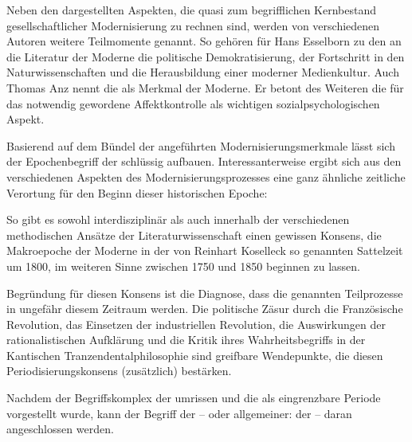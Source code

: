 Neben den dargestellten Aspekten, die quasi zum begrifflichen Kernbestand
gesellschaftlicher Modernisierung zu rechnen sind, werden von verschiedenen
Autoren weitere Teilmomente genannt. So gehören  für Hans
Esselborn zu den \Cite{zentralen außerliterarischen Herausforderungen} an die
Literatur der Moderne die politische Demokratisierung, der Fortschritt in den
Naturwissenschaften und die Herausbildung einer moderner
Medienkultur. Auch Thomas Anz nennt
die \Cite{Expansion massenkommunkativer Prozesse} als Merkmal der
\Cite{zivilisatorischen} Moderne. Er betont des Weiteren die für das
\Cite{zivilisierte Subjekt} notwendig gewordene Affektkontrolle als wichtigen
sozialpsychologischen Aspekt.

Basierend auf dem Bündel der angeführten Modernisierungsmerkmale lässt sich
der Epochenbegriff der \Cite{gesellschaftlichen Moderne} schlüssig aufbauen.
Interessanterweise ergibt sich aus den verschiedenen Aspekten des
Modernisierungsprozesses eine ganz ähnliche zeitliche Verortung für den Beginn
dieser historischen Epoche:

\begin{BlockQuote}
  So gibt es sowohl interdisziplinär als auch innerhalb der verschiedenen
  methodischen Ansätze der Literaturwissenschaft einen gewissen Konsens, die
  Makroepoche der Moderne in der von Reinhart Koselleck so genannten Sattelzeit
  um 1800, im weiteren Sinne zwischen 1750 und 1850 beginnen zu
  lassen.
\end{BlockQuote}
Begründung für diesen Konsens ist die Diagnose, dass die genannten
Teilprozesse in ungefähr diesem Zeitraum \Cite{irreversibel} werden.  Die
politische Zäsur durch die Französische Revolution, das Einsetzen der
industriellen Revolution, die Auswirkungen der rationalistischen Aufklärung
und die Kritik ihres Wahrheitsbegriffs in der Kantischen
Tranzendentalphilosophie sind greifbare Wendepunkte, die diesen
Periodisierungskonsens (zusätzlich) bestärken.


Nachdem der Begriffskomplex der\Cite{gesellschaftlichen Modernisierung}
umrissen und die \Cite{historische Moderne} als eingrenzbare Periode
vorgestellt wurde, kann der Begriff der \Cite{literarischen Moderne} -- oder
allgemeiner: der \Cite{ästhetischen Moderne} -- daran angeschlossen werden.

